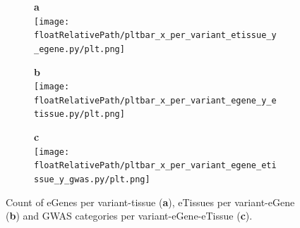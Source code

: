 %
%
\begin{figure}[!tbp]
\centering
%
\begin{subfigure}[]{.32\textwidth}
\textbf{a}
\\
\texttt{[image: \\floatRelativePath/pltbar\_x\_per\_variant\_etissue\_y\_egene.py/plt.png]}
\end{subfigure}
%
\begin{subfigure}[]{.32\textwidth}
\textbf{b}
\\
\texttt{[image: \\floatRelativePath/pltbar\_x\_per\_variant\_egene\_y\_etissue.py/plt.png]}
\end{subfigure}
%
\begin{subfigure}[]{.32\textwidth}
\textbf{c}
\\
\texttt{[image: \\floatRelativePath/pltbar\_x\_per\_variant\_egene\_etissue\_y\_gwas.py/plt.png]}
\end{subfigure}
%
\caption{Count of eGenes per variant-tissue (\textbf{a}), eTissues per variant-eGene (\textbf{b}) and GWAS categories per variant-eGene-eTissue (\textbf{c}).} \label{fig:gwas_egene_etisue_per_variant}
%
\end{figure}
%

